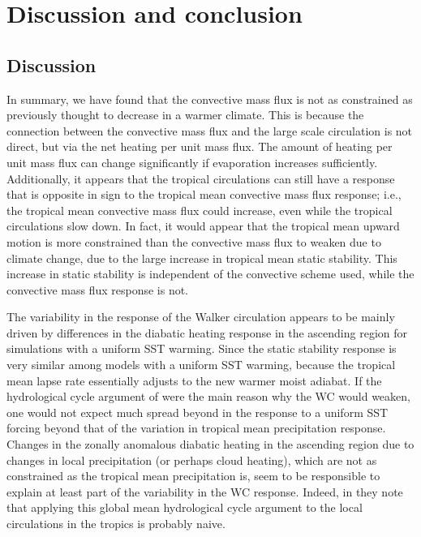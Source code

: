 \documentclass[letterpaper,12pt,titlepage,oneside,final]{book}
\begin{document}
\chapter{Discussion and conclusion}
\section{Discussion}
In summary, we have found that the convective mass flux is not as constrained as previously thought to decrease in a warmer climate. This is because the connection between the convective mass flux and the large scale circulation is not direct, but via the net heating per unit mass flux. The amount of heating per unit mass flux can change significantly if evaporation increases sufficiently. Additionally, it appears that the tropical circulations can still have a response that is opposite in sign to the tropical mean convective mass flux response; i.e., the tropical mean convective mass flux could increase, even while the tropical circulations slow down. In fact, it would appear that the tropical mean upward motion is more constrained than the convective mass flux to weaken due to climate change, due to the large increase in tropical mean static stability. This increase in static stability is independent of the convective scheme used, while the convective mass flux response is not.

The variability in the response of the Walker circulation appears to be mainly driven by differences in the diabatic heating response in the ascending region for simulations with a uniform SST warming. Since the static stability response is very similar among models with a uniform SST warming, because the tropical mean lapse rate essentially adjusts to the new warmer moist adiabat. If the hydrological cycle argument of \citep{held_robust_2006} were the main reason why the WC would weaken, one would not expect much spread beyond in the response to a uniform SST forcing beyond that of the variation in tropical mean precipitation response. Changes in the zonally anomalous diabatic heating in the ascending region due to changes in local precipitation (or perhaps cloud heating), which are not as constrained as the tropical mean precipitation is, seem to be responsible to explain at least part of the variability in the WC response. Indeed, in \citep{schneider_water_2010} they note that applying this global mean hydrological cycle argument to the local circulations in the tropics is probably naive.
\end{document}
